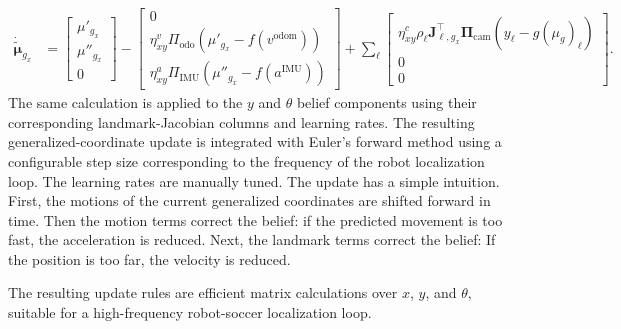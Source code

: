 {
\small
\begin{align}
\dot{\tilde{\boldsymbol{\mu}}}_{g_x}
&\!=\!
\begin{bmatrix}
\mu'_{g_x}\\
\mu''_{g_x}\\
0
\end{bmatrix}
\!-\!
\begin{bmatrix}
0\\
\eta^{v}_{xy}\Pi_{\mathrm{odo}}
\left(\mu'_{g_x}-f(v^{\mathrm{odom}})\right)\\
\eta^{a}_{xy}\Pi_{\mathrm{IMU}}
\left(\mu''_{g_x}-f(a^{\mathrm{IMU}})\right)
\end{bmatrix}
\!+\!
\sum_{\ell}
\begin{bmatrix}
\eta^{c}_{xy}
\rho_\ell \boldsymbol{J}_{\ell,g_x}^{\top}
\boldsymbol{\Pi}_{\mathrm{cam}}
\left(y_\ell-g(\mu_g)_\ell\right)\\
0\\
0
\end{bmatrix}.
\end{align}
}
The same calculation is applied to the $y$ and $\theta$ belief components using their corresponding landmark-Jacobian columns and learning rates. The resulting generalized-coordinate update is integrated with Euler's forward method using a configurable step size corresponding to the frequency of the robot localization loop. The learning rates are manually tuned. The update has a simple intuition. First, the motions of the current generalized coordinates are shifted forward in time. Then the motion terms correct the belief: if the predicted movement is too fast, the acceleration is reduced. Next, the landmark terms correct the belief: If the position is too far, the velocity is reduced.

 The resulting update rules are efficient matrix calculations over $x$, $y$, and $\theta$, suitable for a high-frequency robot-soccer localization loop.
